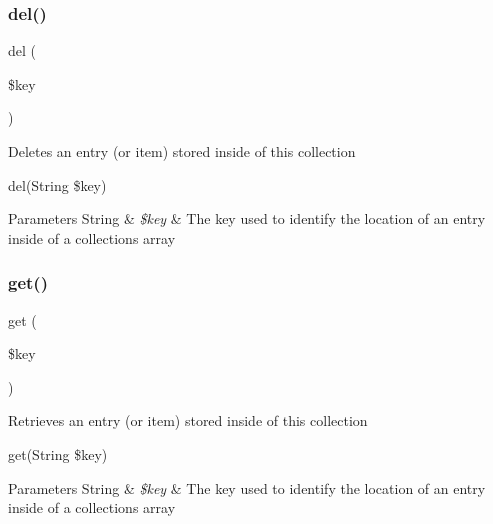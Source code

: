 \subsubsection{\texorpdfstring{del()}{del()}}
{\footnotesize\ttfamily del (\begin{DoxyParamCaption}\item[{}]{\$key }\end{DoxyParamCaption})}

Deletes an entry (or item) stored inside of this collection

del(String \$key)


\begin{DoxyParams}[1]{Parameters}
String & {\em \$key} & The key used to identify the location of an entry inside of a collection\textquotesingle{}s array \\
\hline
\end{DoxyParams}
\mbox{\label{class_w_a_f_f_l_e_1_1_framework_1_1_assembly_1_1_collection_a24a9bf83a1002d46ece83a93d14bd921}} 
\subsubsection{\texorpdfstring{get()}{get()}}
{\footnotesize\ttfamily get (\begin{DoxyParamCaption}\item[{}]{\$key }\end{DoxyParamCaption})}

Retrieves an entry (or item) stored inside of this collection

get(String \$key)


\begin{DoxyParams}[1]{Parameters}
String & {\em \$key} & The key used to identify the location of an entry inside of a collection\textquotesingle{}s array \\
\hline
\end{DoxyParams}
\mbox{\label{class_w_a_f_f_l_e_1_1_framework_1_1_assembly_1_1_collection_a72540410e5d139cfba23a4f39ecc32be}} 
